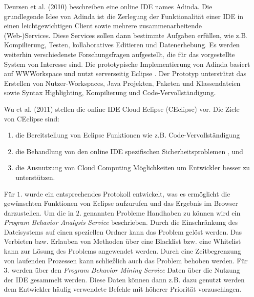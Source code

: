 Deursen et al. (2010) \cite{van_deursen_adinda_2010} beschreiben eine online IDE names Adinda. Die grundlegende Idee von Adinda ist die Zerlegung der Funktionalität einer IDE in einen leichtgewichtigen Client sowie mehrere zusammenarbeitende (Web-)Services. Diese Services sollen dann bestimmte Aufgaben erfüllen, wie z.B. Kompilierung, Testen, kollaboratives Editieren und Datenerhebung. Es werden weiterhin verschiedenste Forschungsfragen aufgestellt, die für das vorgestellte System von Interesse sind. Die prototypische Implementierung von Adinda basiert auf WWWorkspace \cite{ryan_web_2007} und nutzt serverseitig Eclipse \cite{noauthor_eclipse_nodate}. Der Prototyp unterstützt das Erstellen von Nutzer-Workspaces, Java Projekten, Paketen und Klassendateien sowie Syntax Highlighting, Kompilierung und Code-Vervollständigung. 

Wu et al. (2011) \cite{wu_ceclipse_2011} stellen die online IDE Cloud Eclipse (CEclipse) vor. Die Ziele von CEclipse sind:
\begin{enumerate}
    \item die Bereitstellung von Eclipse \cite{noauthor_eclipse_nodate} Funktionen wie z.B. Code-Vervollständigung
    \item die Behandlung von den online IDE spezifischen Sicherheitsproblemen ,  und 
    \item die Ausnutzung von Cloud Computing Möglichkeiten um Entwickler besser zu unterstützen.
\end{enumerate}
Für $1.$ wurde ein entsprechendes Protokoll entwickelt, was es ermöglicht die gewünschten Funktionen von Eclipse aufzurufen und das Ergebnis im Browser darzustellen. Um die in $2.$ genannten Probleme Handhaben zu können wird ein \textit{Program Behavior Analysis Service} beschrieben. Durch die Einschränkung des Dateisystems auf einen speziellen Ordner kann das Problem  gelöst werden. Das Verbieten bzw. Erlauben von Methoden über eine Blacklist bzw. eine Whitelist kann zur Lösung des Problems  angewendet werden. Durch eine Zeitbegrenzung von laufenden Prozessen kann schließlich auch das Problem  behoben werden. Für $3.$ werden über den \textit{Program Behavior Mining Service} Daten über die Nutzung der IDE gesammelt werden. Diese Daten können dann z.B. dazu genutzt werden dem Entwickler häufig verwendete Befehle mit höherer Priorität vorzuschlagen. 

